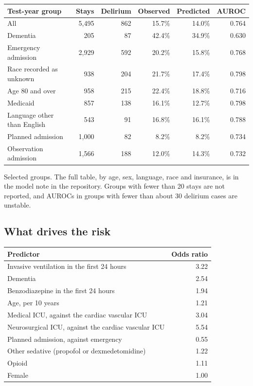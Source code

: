 \documentclass[11pt]{article}
\begin{document}
\begin{center}
\small
\begin{tabular}{l r r r r r}
	\toprule
	Test-year group & Stays & Delirium & Observed & Predicted & AUROC \\
	\midrule
	All & 5,495 & 862 & 15.7\% & 14.0\% & 0.764 \\
	Dementia & 205 & 87 & 42.4\% & 34.9\% & 0.630 \\
	Emergency admission & 2,929 & 592 & 20.2\% & 15.8\% & 0.768 \\
	Race recorded as unknown & 938 & 204 & 21.7\% & 17.4\% & 0.798 \\
	Age 80 and over & 958 & 215 & 22.4\% & 18.8\% & 0.716 \\
	Medicaid & 857 & 138 & 16.1\% & 12.7\% & 0.798 \\
	Language other than English & 543 & 91 & 16.8\% & 16.1\% & 0.788 \\
	Planned admission & 1,000 & 82 & 8.2\% & 8.2\% & 0.734 \\
	Observation admission & 1,566 & 188 & 12.0\% & 14.3\% & 0.732 \\
	\bottomrule
\end{tabular}
\end{center}

{\small\color{black!60}Selected groups. The full table, by age, sex, language, race and insurance, is in the model note in the repository. Groups with fewer than 20 stays are not reported, and AUROCs in groups with fewer than about 30 delirium cases are unstable.\par}

\subsection*{What drives the risk}

\begin{center}
\begin{tabular}{l r}
	\toprule
	Predictor & Odds ratio \\
	\midrule
	Invasive ventilation in the first 24 hours & 3.22 \\
	Dementia & 2.54 \\
	Benzodiazepine in the first 24 hours & 1.94 \\
	Age, per 10 years & 1.21 \\
	Medical ICU, against the cardiac vascular ICU & 3.04 \\
	Neurosurgical ICU, against the cardiac vascular ICU & 5.54 \\
	Planned admission, against emergency & 0.55 \\
	Other sedative (propofol or dexmedetomidine) & 1.22 \\
	Opioid & 1.11 \\
	Female & 1.00 \\
	\bottomrule
\end{tabular}
\end{center}
\end{document}
